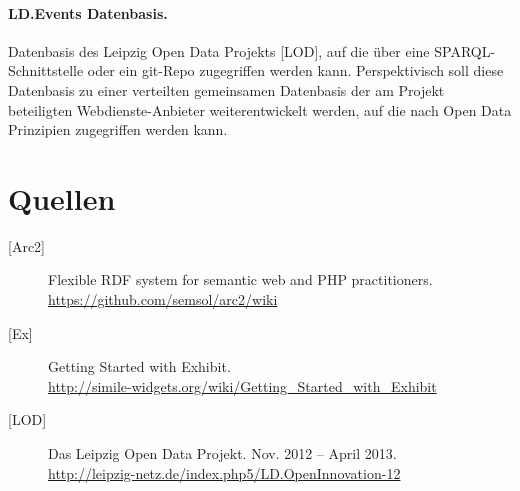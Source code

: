 \documentclass[11pt,a4paper]{article}
\begin{document}
\paragraph{LD.Events Datenbasis.} 
Datenbasis des Leipzig Open Data Projekts [LOD], auf die über eine
SPARQL-Schnittstelle oder ein git-Repo zugegriffen werden kann.
Perspektivisch soll diese Datenbasis zu einer verteilten gemeinsamen
Datenbasis der am Projekt beteiligten Web\-dienste-Anbieter weiterentwickelt
werden, auf die nach Open Data Prinzipien zugegriffen werden kann.

\section{Quellen}

\begin{description}
\item[{[Arc2]}] Flexible RDF system for semantic web and PHP practitioners.\\ 
\url{https://github.com/semsol/arc2/wiki}

\item[{[Ex]}] Getting Started with Exhibit. \\
\url{http://simile-widgets.org/wiki/Getting_Started_with_Exhibit}

\item[{[LOD]}] Das Leipzig Open Data Projekt. Nov. 2012 -- April 2013. \\
\url{http://leipzig-netz.de/index.php5/LD.OpenInnovation-12}

\end{description}
\end{document}
